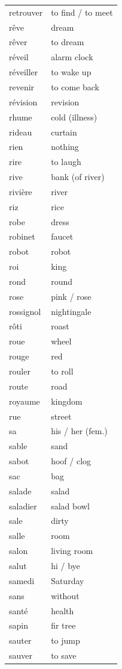\documentclass[12pt,a4paper]{article}
\begin{document}
\begin{longtable}{p{4cm} p{6cm}}
retrouver & to find / to meet \\
rêve & dream \\
rêver & to dream \\
réveil & alarm clock \\
réveiller & to wake up \\
revenir & to come back \\
révision & revision \\
rhume & cold (illness) \\
rideau & curtain \\
rien & nothing \\
rire & to laugh \\
rive & bank (of river) \\
rivière & river \\
riz & rice \\
robe & dress \\
robinet & faucet \\
robot & robot \\
roi & king \\
rond & round \\
rose & pink / rose \\
rossignol & nightingale \\
rôti & roast \\
roue & wheel \\
rouge & red \\
rouler & to roll \\
route & road \\
royaume & kingdom \\
rue & street \\
sa & his / her (fem.) \\
sable & sand \\
sabot & hoof / clog \\
sac & bag \\
salade & salad \\
saladier & salad bowl \\
sale & dirty \\
salle & room \\
salon & living room \\
salut & hi / bye \\
samedi & Saturday \\
sans & without \\
santé & health \\
sapin & fir tree \\
sauter & to jump \\
sauver & to save \\

\end{longtable}
\end{document}
